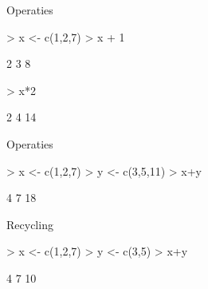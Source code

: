 \documentclass{beamer}
\begin{document}

\begin{frame}[fragile]{Operaties}
\begin{Schunk}
\begin{Sinput}
> x <- c(1,2,7)
> x + 1 
\end{Sinput}
\begin{Soutput}
[1] 2 3 8
\end{Soutput}
\begin{Sinput}
> x*2
\end{Sinput}
\begin{Soutput}
[1]  2  4 14
\end{Soutput}
\end{Schunk}

\end{frame}


\begin{frame}[fragile]{Operaties}
\begin{Schunk}
\begin{Sinput}
> x <- c(1,2,7)
> y <- c(3,5,11)
> x+y
\end{Sinput}
\begin{Soutput}
[1]  4  7 18
\end{Soutput}
\end{Schunk}

\end{frame}



\begin{frame}[fragile]{Recycling}
\begin{Schunk}
\begin{Sinput}
> x <- c(1,2,7)
> y <- c(3,5)
> x+y
\end{Sinput}
\begin{Soutput}
[1]  4  7 10
\end{Soutput}
\end{Schunk}

\end{frame}
\end{document}
